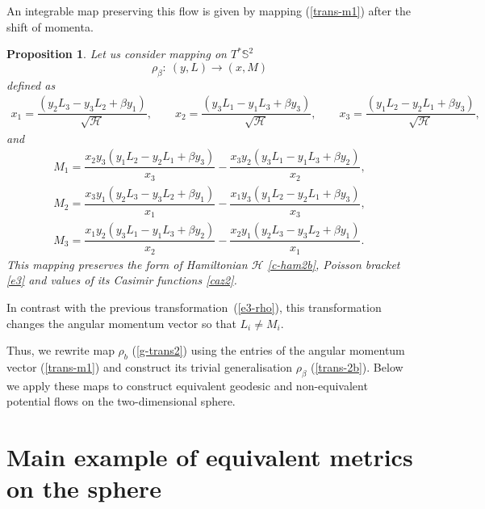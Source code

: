 \documentclass[10pt,a4paper]{amsart}
\numberwithin{equation}{section}
\newtheorem{Proposition}[Theorem]{Proposition}
 { \theoremstyle{definition}
\newtheorem{Definition}[Theorem]{Definition}
\newtheorem{Note}[Theorem]{Note}
\newtheorem{Example}[Theorem]{Example}
\newtheorem{Remark}[Theorem]{Remark} }
\begin{document}
An integrable map preserving this flow is given by mapping (\ref{trans-m1}) after the shift of momenta.
\begin{Proposition}
Let us consider mapping on $T^*\mathbb S^2$
\[\rho_\beta\colon \  (y,L)\to (x,M)\]
 defined as
\begin{gather*}
x_1=\dfrac{(y_2L_3-y_3L_2+\beta y_1)}{\sqrt{\mathcal H}} ,\qquad\!\!
x_2=\dfrac{(y_3L_1-y_1L_3+\beta y_3)}{\sqrt{\mathcal H}} ,\qquad\!\!
x_3=\dfrac{(y_1L_2-y_2L_1+\beta y_3)}{\sqrt{\mathcal H}} ,
\end{gather*}
and
\begin{gather}
M_1=\dfrac{x_2y_3(y_1L_2 -y_2 L_1+\beta y_3)}{x_3} -\dfrac{ x_3y_2(y_3L_1 -y_1 L_3+\beta y_2)}{x_2} ,\nonumber\\
M_2=\dfrac{ x_3y_1(y_2L_3 - y_3L_2+\beta y_1)}{x_1}-\dfrac{x_1y_3(y_1L_2-y_2L_1+\beta y_3)}{x_3} ,\nonumber\\
M_3=\dfrac{x_1y_2(y_3L_1 -y_1L_3+\beta y_2)}{x_2}-\dfrac{x_2y_1(y_2L_3 -y_3L_2+\beta y_1)}{x_1} .\label{trans-2b}
\end{gather}
This mapping preserves the form of Hamiltonian $\mathcal H$ \eqref{c-ham2b}, Poisson bracket \eqref{e3} and values of its Casimir functions \eqref{caz2}.
\end{Proposition}
In contrast with the previous transformation~(\ref{e3-rho}), this transformation changes the angular momentum vector so that $L_i\neq M_i$.

Thus, we rewrite map $\rho_b$ (\ref{g-trans2}) using the entries of the angular momentum vector (\ref{trans-m1}) and construct its trivial generalisation $\rho_\beta$ (\ref{trans-2b}). Below we apply these maps to construct equivalent geodesic and non-equivalent potential flows on the two-dimensional sphere.

\section{Main example of equivalent metrics on the sphere}\label{section3}
\end{document}

